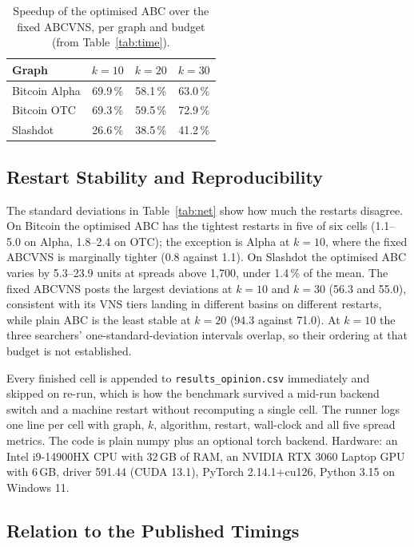 \documentclass[journal,letterpaper,10pt]{IEEEtran}
\begin{document}
\begin{table}[!t]
\centering
\caption{Speedup of the optimised ABC over the fixed ABCVNS, per graph and budget (from Table~\ref{tab:time}).}
\label{tab:speedup}
\footnotesize
\setlength{\tabcolsep}{6pt}
\begin{tabular}{@{}lccc@{}}
\toprule
Graph & $k{=}10$ & $k{=}20$ & $k{=}30$\\
\midrule
Bitcoin Alpha & 69.9\,\% & 58.1\,\% & 63.0\,\%\\
Bitcoin OTC   & 69.3\,\% & 59.5\,\% & 72.9\,\%\\
Slashdot      & 26.6\,\% & 38.5\,\% & 41.2\,\%\\
\bottomrule
\end{tabular}
\end{table}

\subsection{Restart Stability and Reproducibility}

The standard deviations in Table~\ref{tab:net} show how much the restarts disagree. On Bitcoin the optimised ABC has the tightest restarts in five of six cells (1.1--5.0 on Alpha, 1.8--2.4 on OTC); the exception is Alpha at $k=10$, where the fixed ABCVNS is marginally tighter (0.8 against 1.1). On Slashdot the optimised ABC varies by 5.3--23.9 units at spreads above 1{,}700, under 1.4\,\% of the mean. The fixed ABCVNS posts the largest deviations at $k=10$ and $k=30$ (56.3 and 55.0), consistent with its VNS tiers landing in different basins on different restarts, while plain ABC is the least stable at $k=20$ (94.3 against 71.0). At $k=10$ the three searchers' one-standard-deviation intervals overlap, so their ordering at that budget is not established.

Every finished cell is appended to \texttt{results\_opinion.csv} immediately and skipped on re-run, which is how the benchmark survived a mid-run backend switch and a machine restart without recomputing a single cell. The runner logs one line per cell with graph, $k$, algorithm, restart, wall-clock and all five spread metrics. The code is plain numpy plus an optional torch backend. Hardware: an Intel i9-14900HX CPU with 32\,GB of RAM, an NVIDIA RTX 3060 Laptop GPU with 6\,GB, driver 591.44 (CUDA 13.1), PyTorch 2.14.1+cu126, Python 3.15 on Windows 11.

\subsection{Relation to the Published Timings}
\end{document}

